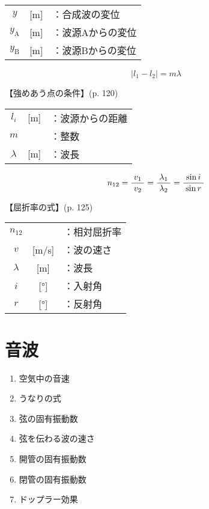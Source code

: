 \documentclass[10pt]{jarticle}
\begin{document}
\begin{tabular}{ccl}
$y$	& [m]	&：合成波の変位\\
$y_\mathrm{A}$	& [m]	&：波源Aからの変位\\
$y_\mathrm{B}$	& [m]	&：波源Bからの変位
\end{tabular}

\newpage


\[
| l_1 - l_2 |= m \lambda
\]


\vskip3mm
【強めあう点の条件】{\footnotesize (p. 120)}

\begin{tabular}{ccl}
$l_i$	& [m]	&：波源からの距離\\
$m$	& 	&：整数\\
$\lambda$	& [m]	&：波長
\end{tabular}

\newpage




\[
n_{12}	= \frac{v_1}{\; v_2 \;}
	= \frac{\lambda_1}{\; \lambda_2 \;}
	= \frac{\sin i}{\; \sin r \;} \\
\]


\vskip3mm
【屈折率の式】{\footnotesize (p. 125)}

\begin{tabular}{ccl}
$n_{12}$	&	&：相対屈折率\\
$v$	& [m/s]	&：波の速さ\\
$\lambda$	&[m]	&：波長\\
$i$	&[°]	&：入射角\\
$r$	&[°]	&：反射角\\
\end{tabular}




\newpage
\addtocounter{page}{-1}
\thispagestyle{empty}
\section{音波}

\begin{enumerate}
\setcounter{enumi}{\thepage}
\small
\itemsep-4mm
\item 空気中の音速\\
\item うなりの式\\
\item 弦の固有振動数\\
\item 弦を伝わる波の速さ\\
\item 開管の固有振動数\\
\item 閉管の固有振動数\\
\item ドップラー効果\\
\end{enumerate}
\newpage
\end{document}
